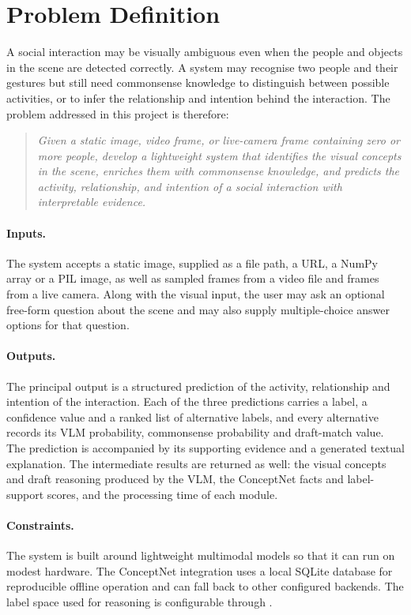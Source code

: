 \documentclass[12pt,a4paper,oneside]{report}
\begin{document}
\section{Problem Definition}

A social interaction may be visually ambiguous even when the people and objects
in the scene are detected correctly. A system may recognise two people and
their gestures but still need commonsense knowledge to distinguish between
possible activities, or to infer the relationship and intention behind the
interaction. The problem addressed in this project is therefore:

\begin{quote}
\itshape Given a static image, video frame, or live-camera frame containing zero
or more people, develop a lightweight system that identifies the visual
concepts in the scene, enriches them with commonsense knowledge, and predicts
the activity, relationship, and intention of a social interaction with
interpretable evidence.
\end{quote}

\paragraph{Inputs.} The system accepts a static image, supplied as a file path,
a URL, a NumPy array or a PIL image, as well as sampled frames from a video file
and frames from a live camera. Along with the visual input, the user may ask an
optional free-form question about the scene and may also supply
multiple-choice answer options for that question.

\paragraph{Outputs.} The principal output is a structured prediction of the
activity, relationship and intention of the interaction. Each of the three
predictions carries a label, a confidence value and a ranked list of
alternative labels, and every alternative records its VLM probability,
commonsense probability and draft-match value. The prediction is accompanied by
its supporting evidence and a generated textual explanation. The intermediate
results are returned as well: the visual concepts and draft reasoning produced
by the VLM, the ConceptNet facts and label-support scores, and the processing
time of each module.

\paragraph{Constraints.} The system is built around lightweight multimodal
models so that it can run on modest hardware. The ConceptNet integration uses a
local SQLite database for reproducible offline operation and can fall back to
other configured backends. The label space used for reasoning is configurable
through .
\end{document}
